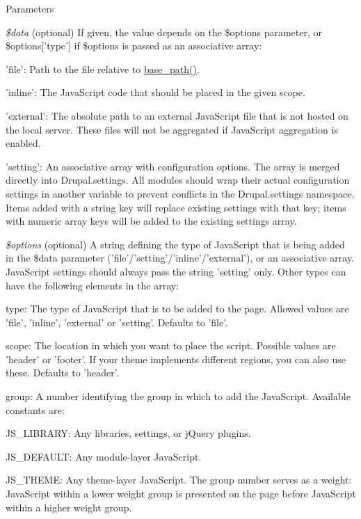 \begin{DoxyParams}{Parameters}
\item[{\em \$data}](optional) If given, the value depends on the \$options parameter, or \$options\mbox{[}'type'\mbox{]} if \$options is passed as an associative array:
\begin{DoxyItemize}
\item 'file': Path to the file relative to \hyperlink{common_8inc_ae227697e9c239f09fd7e36f71afde771}{base\_\-path()}.
\item 'inline': The JavaScript code that should be placed in the given scope.
\item 'external': The absolute path to an external JavaScript file that is not hosted on the local server. These files will not be aggregated if JavaScript aggregation is enabled.
\item 'setting': An associative array with configuration options. The array is merged directly into Drupal.settings. All modules should wrap their actual configuration settings in another variable to prevent conflicts in the Drupal.settings namespace. Items added with a string key will replace existing settings with that key; items with numeric array keys will be added to the existing settings array. 
\end{DoxyItemize}\item[{\em \$options}](optional) A string defining the type of JavaScript that is being added in the \$data parameter ('file'/'setting'/'inline'/'external'), or an associative array. JavaScript settings should always pass the string 'setting' only. Other types can have the following elements in the array:
\begin{DoxyItemize}
\item type: The type of JavaScript that is to be added to the page. Allowed values are 'file', 'inline', 'external' or 'setting'. Defaults to 'file'.
\item scope: The location in which you want to place the script. Possible values are 'header' or 'footer'. If your theme implements different regions, you can also use these. Defaults to 'header'.
\item group: A number identifying the group in which to add the JavaScript. Available constants are:
\begin{DoxyItemize}
\item JS\_\-LIBRARY: Any libraries, settings, or jQuery plugins.
\item JS\_\-DEFAULT: Any module-\/layer JavaScript.
\item JS\_\-THEME: Any theme-\/layer JavaScript. The group number serves as a weight: JavaScript within a lower weight group is presented on the page before JavaScript within a higher weight group.

\end{DoxyItemize}
\end{DoxyItemize}
\end{DoxyParams}
